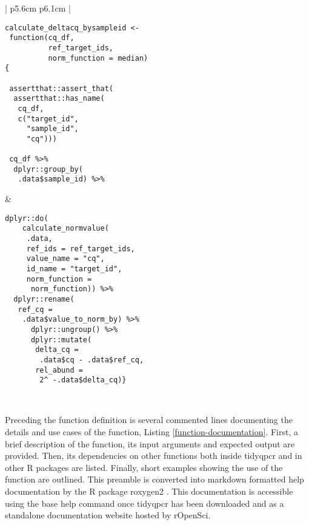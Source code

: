 \documentclass[../main.tex]{subfiles}
\begin{document}
\begin{table}
\centering
\begin{tabular}{| p{5.6cm}  p{6.1cm} |}
\hline
\begin{lstlisting}[style=mystyle]
calculate_deltacq_bysampleid <- 
 function(cq_df,
          ref_target_ids,
          norm_function = median) 
{

 assertthat::assert_that(
  assertthat::has_name(
   cq_df, 
   c("target_id",
     "sample_id",
     "cq")))
     
 cq_df %>%
  dplyr::group_by(
   .data$sample_id) %>%
\end{lstlisting} &

\begin{lstlisting}[firstnumber=17, style=mystyle]
   dplyr::do(
    calculate_normvalue(
     .data,
     ref_ids = ref_target_ids,
     value_name = "cq",
     id_name = "target_id",
     norm_function = 
      norm_function)) %>%
  dplyr::rename(
   ref_cq = 
    .data$value_to_norm_by) %>%
      dplyr::ungroup() %>%
      dplyr::mutate(
       delta_cq = 
        .data$cq - .data$ref_cq,
       rel_abund = 
        2^ -.data$delta_cq)}
\end{lstlisting} \\
\hline
\end{tabular}
\caption{Function definition for the calculate $\Delta$Cq method within tidyqpcr. This example showcases the use of the \lstinline{group_by} function provided by the core tidyverse package dplyr to split the Cq values by \lstinline{sample_id} and apply the \lstinline{calculate_normvalue} on each group separately.}
\label{define-function}
\end{table}
Preceding the function definition is several commented lines documenting the details and use cases of the function, Listing \ref{function-documentation}. 
First, a brief description of the function, its input arguments and expected output are provided. 
Then, its dependencies on other functions both inside tidyqpcr and in other R packages are listed. 
Finally, short examples showing the use of the function are outlined. 
This preamble is converted into markdown formatted help documentation by the R package roxygen2 \parencite{Wickham2021}. 
This documentation is accessible using the base help command once tidyqpcr has been downloaded and as a standalone documentation website hosted by rOpenSci.
\end{document}
